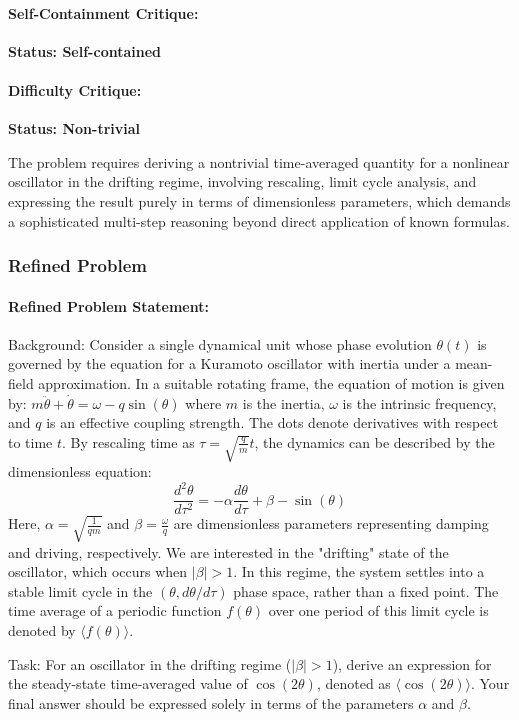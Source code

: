 \documentclass[10pt]{article}
\begin{document}
\paragraph*{Self-Containment Critique:}
\textcolor{pass}{\textbf{Status: Self-contained}}




\paragraph*{Difficulty Critique:}
\textcolor{pass}{\textbf{Status: Non-trivial}}

The problem requires deriving a nontrivial time-averaged quantity for a nonlinear oscillator in the drifting regime, involving rescaling, limit cycle analysis, and expressing the result purely in terms of dimensionless parameters, which demands a sophisticated multi-step reasoning beyond direct application of known formulas.


\subsubsection*{Refined Problem}
\paragraph*{Refined Problem Statement:}
Background:
Consider a single dynamical unit whose phase evolution $\theta(t)$ is governed by the equation for a Kuramoto oscillator with inertia under a mean-field approximation. In a suitable rotating frame, the equation of motion is given by:
$m \ddot{\theta} + \dot{\theta} = \omega - q \sin(\theta)$
where $m$ is the inertia, $\omega$ is the intrinsic frequency, and $q$ is an effective coupling strength. The dots denote derivatives with respect to time $t$. By rescaling time as $\tau = \sqrt{\frac{q}{m}} t$, the dynamics can be described by the dimensionless equation:
$$ \frac{d^2\theta}{d\tau^2} = - \alpha \frac{d\theta}{d\tau} + \beta - \sin(\theta) $$
Here, $\alpha = \sqrt{\frac{1}{qm}}$ and $\beta = \frac{\omega}{q}$ are dimensionless parameters representing damping and driving, respectively. We are interested in the "drifting" state of the oscillator, which occurs when $|\beta| > 1$. In this regime, the system settles into a stable limit cycle in the $(\theta, d\theta/d\tau)$ phase space, rather than a fixed point. The time average of a periodic function $f(\theta)$ over one period of this limit cycle is denoted by $\langle f(\theta) \rangle$.

Task:
For an oscillator in the drifting regime ($|\beta| > 1$), derive an expression for the steady-state time-averaged value of $\cos(2\theta)$, denoted as $\langle\cos(2\theta)\rangle$. Your final answer should be expressed solely in terms of the parameters $\alpha$ and $\beta$.
\end{document}
